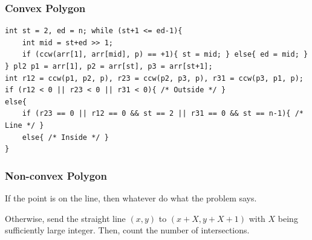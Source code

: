 \subsubsection*{Convex Polygon}
\begin{verbatim}
int st = 2, ed = n; while (st+1 <= ed-1){
	int mid = st+ed >> 1;
	if (ccw(arr[1], arr[mid], p) == +1){ st = mid; } else{ ed = mid; }
} pl2 p1 = arr[1], p2 = arr[st], p3 = arr[st+1];
int r12 = ccw(p1, p2, p), r23 = ccw(p2, p3, p), r31 = ccw(p3, p1, p);
if (r12 < 0 || r23 < 0 || r31 < 0){ /* Outside */ }
else{
	if (r23 == 0 || r12 == 0 && st == 2 || r31 == 0 && st == n-1){ /* Line */ }
	else{ /* Inside */ }
}
\end{verbatim}

\subsubsection*{Non-convex Polygon}
If the point is on the line, then whatever do what the problem says.

Otherwise, send the straight line $(x, y)$ to $(x+X, y+X+1)$ with $X$ being sufficiently large integer. Then, count the number of intersections.